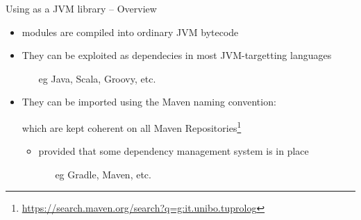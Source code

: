 \documentclass[handout]{beamer}
\begin{document}
\begin{frame}{Using \twopkt{} as a JVM library -- Overview}
    \begin{itemize}
        \item \twopkt{} modules are compiled into ordinary JVM bytecode 
        
        \vfill

        \item They can be exploited as dependecies in most JVM-targetting languages
        \begin{itemize}
            \item[eg] Java, Scala, Groovy, etc.
        \end{itemize}

        \vfill

        \item They can be imported using the Maven naming convention:
        which are kept coherent on all Maven Repositories\footnote{\url{https://search.maven.org/search?q=g:it.unibo.tuprolog}}
        \begin{itemize}
            \item provided that some dependency management system is in place
            \begin{itemize}
                \item[eg] Gradle, Maven, etc.
            \end{itemize}
        \end{itemize}
    \end{itemize}
\end{frame}
\end{document}
